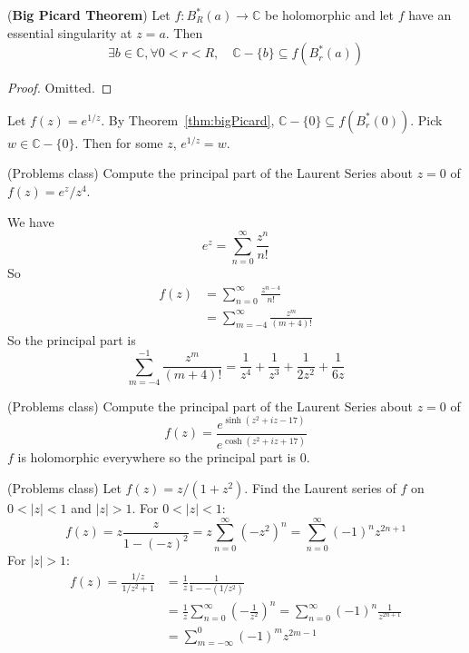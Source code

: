 \begin{theorem}\label{thm:bigPicard}
	(\textbf{Big Picard Theorem}) Let $f: B_R^*(a) \to \mathbb{C}$ be holomorphic and let $f$ have an essential singularity at $z = a$. Then
	\[
		\exists b \in \mathbb{C}, \forall 0 < r < R, \quad \mathbb{C} - \{ b \} \subseteq f(B_r^*(a))
	\]
\end{theorem}

\begin{proof}
	Omitted.
\end{proof}

\begin{example}
	Let $f(z) = e^{1 / z}$. By Theorem~\ref{thm:bigPicard}, $\mathbb{C} - \{ 0 \} \subseteq f(B_r^*(0))$. Pick $w \in \mathbb{C} - \{ 0 \}$. Then for some $z$, $e^{1 / z} = w$.
\end{example}

\begin{example}
	(Problems class) Compute the principal part of the Laurent Series about $z = 0$ of $f(z) = e^z / z^4$.

	We have
	\[
		e^z = \sum_{n = 0}^{\infty} \frac{z^n}{n!}
	\]
	So
	\[
		\begin{aligned}
			f(z)
				& = \sum_{n = 0}^{\infty} \frac{z^{n - 4}}{n!} \\
				& = \sum_{m = -4}^{\infty} \frac{z^m}{(m + 4)!}
		\end{aligned}
	\]
	So the principal part is
	\[
		\sum_{m = -4}^{-1} \frac{z^m}{(m + 4)!} = \frac{1}{z^4} + \frac{1}{z^3} + \frac{1}{2z^2} + \frac{1}{6z}
	\]
\end{example}

\begin{example}
	(Problems class) Compute the principal part of the Laurent Series about $z = 0$ of
	\[
		f(z) = \frac{e^{\sinh(z^2 + iz - 17)}}{e^{\cosh(z^2 + iz + 17)}}
	\]
	$f$ is holomorphic everywhere so the principal part is $0$.
\end{example}

\begin{example}
	(Problems class) Let $f(z) = z / (1 + z^2)$. Find the Laurent series of $f$ on $0 < |z| < 1$ and $|z| > 1$.
	For $0 < |z| < 1$:
	\[
		f(z) = z \frac{z}{1 - {(-z)}^2} = z \sum_{n = 0}^{\infty} {(-z^2)}^n = \sum_{n = 0}^{\infty} {(-1)}^n z^{2n + 1}
	\]
	For $|z| > 1$:
	\[
		\begin{aligned}
			f(z) = \frac{1/z}{1/z^2 + 1} & = \frac{1}{z} \frac{1}{1 - -(1/z^2)} \\
			& = \frac{1}{z} \sum_{n = 0}^{\infty} \left( -\frac{1}{z^2} \right)^n = \sum_{n = 0}^{\infty} {(-1)}^n \frac{1}{z^{2n + 1}} \\
			& = \sum_{m = -\infty}^{0} {(-1)}^m z^{2m - 1}
		\end{aligned}
	\]
\end{example}

